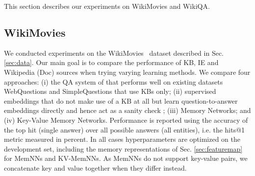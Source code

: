 \documentclass[11pt,letterpaper]{article}
\newcommand{\WikiMovies}{{\sc WikiMovies}\xspace}
\begin{document}
\begin{table}[t!]
	\begin{center}
    	\caption{
          \label{table:memkv-res}
{Development set performance (\% hits@1) with different document memory representations for KV-MemNNs. }}
  	\end{center}
\end{table}







This section describes our experiments on \WikiMovies and
{\sc WikiQA}.

\subsection{WikiMovies} \label{sec:WikiMovies}

We conducted experiments on the \WikiMovies~ dataset described
in Sec. \ref{sec:data}. Our main goal is to
compare the performance of KB, IE and Wikipedia (Doc) sources when
trying varying learning methods.
We compare four approaches:
(i) the QA system of
\cite{bordes2014question} that performs well on existing datasets
WebQuestions \citep{berant2013semantic} and SimpleQuestions \citep{bordes2015large} that use KBs only; (ii) supervised embeddings that do not make use of a KB at all
but learn question-to-answer embeddings directly
and hence act as a sanity check \citep{dodge2015evaluating};
(iii) Memory Networks; and (iv) Key-Value
Memory Networks.
Performance is reported using the accuracy of the top hit (single answer)
over all possible answers (all entities), i.e. the hits@1 metric measured in percent.
In all cases hyperparameters are optimized on the development set, including
the memory representations of Sec. \ref{sec:featuremap} for MemNNs and KV-MemNNs.
As MemNNs do not support key-value pairs, we concatenate key and value together
when they differ instead.
\end{document}
